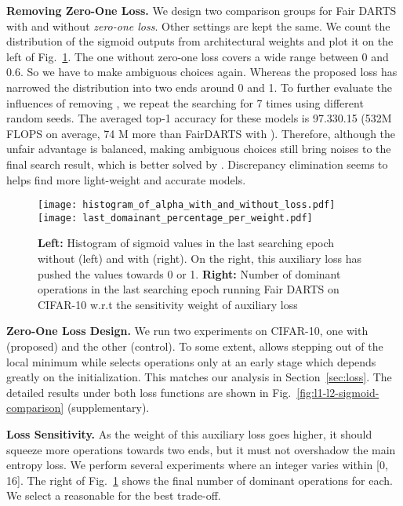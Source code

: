 \documentclass[runningheads]{llncs}
\begin{document}
\textbf{Removing Zero-One Loss.} We design two comparison groups for Fair DARTS with and without \emph{zero-one loss}. Other settings are kept the same. We count the distribution of the sigmoid outputs from architectural weights and plot it on the left of Fig.~\ref{fig:histo-loss-and-weight-dominant}.  The one without zero-one loss covers a wide range between 0 and 0.6. So we have to make ambiguous choices again. Whereas the proposed loss has narrowed the distribution into two ends around 0 and 1. To further evaluate the influences of removing , we repeat the searching for 7 times using different random seeds. The averaged top-1 accuracy for these models is 97.330.15 (532M FLOPS on average, 74 M more than FairDARTS with ). 
Therefore, although the unfair advantage is balanced, making ambiguous choices still bring noises to the final search result, which is better solved by . Discrepancy elimination seems to helps find more light-weight and accurate models.

\begin{figure}[ht]
	\centering
	\texttt{[image: histogram\_of\_alpha\_with\_and\_without\_loss.pdf]}
	\hskip 0.1in
	\texttt{[image: last\_domainant\_percentage\_per\_weight.pdf]}
\caption{\textbf{Left:} Histogram of sigmoid values in the last searching epoch without (left) and with  (right). On the right, this auxiliary loss has pushed the values towards 0 or 1. \textbf{Right:} Number of dominant operations in the last searching epoch running Fair DARTS on CIFAR-10 w.r.t the sensitivity weight  of auxiliary loss }
	\label{fig:histo-loss-and-weight-dominant}
\end{figure} 

\textbf{Zero-One Loss Design.}
We run two experiments on CIFAR-10, one with  (proposed) and the other  (control). To some extent,  allows stepping out of the local minimum while  selects operations only at an early stage which depends greatly on the initialization. This matches our analysis in Section~\ref{sec:loss}. The detailed results under both loss functions are shown in Fig.~\ref{fig:l1-l2-sigmoid-comparison} (supplementary). 


\textbf{Loss Sensitivity.} As the weight  of this auxiliary loss goes higher, it should squeeze more operations towards two ends, but it must not overshadow the main entropy loss. We perform several experiments where an integer  varies within [0, 16]. The right of Fig.~\ref{fig:histo-loss-and-weight-dominant} shows the final number of dominant operations for each. We select a reasonable  for the best trade-off.
\end{document}
